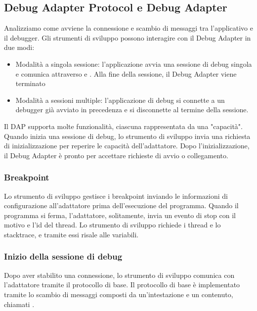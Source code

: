 \subsection{Debug Adapter Protocol e Debug Adapter}

Analizziamo come avviene la connessione e scambio di messaggi tra l'applicativo e il debugger. Gli strumenti di sviluppo possono interagire con il Debug Adapter in due modi:
\begin{itemize}
    \item {
        Modalità a singola sessione: l'applicazione avvia una sessione di debug singola e comunica attraverso  e . Alla fine della sessione, il Debug Adapter viene terminato
    }
    \item {
        Modalità a sessioni multiple: l'applicazione di debug si connette a un debugger già avviato in precedenza e si disconnette al termine della sessione.
    }
\end{itemize}


Il DAP supporta molte funzionalità, ciascuna rappresentata da una "capacità". Quando inizia una sessione di debug, lo strumento di sviluppo invia una richiesta di inizializzazione per reperire le capacità dell'adattatore. Dopo l'inizializzazione, il Debug Adapter è pronto per accettare richieste di avvio o collegamento.
\subsubsection*{Breakpoint}
Lo strumento di sviluppo gestisce i breakpoint inviando le informazioni di configurazione all'adattatore prima dell'esecuzione del programma. Quando il programma si ferma, l'adattatore, solitamente, invia un evento di stop con il motivo e l'id del thread. Lo strumento di sviluppo richiede i thread e lo stacktrace, e tramite essi risale alle variabili.

\subsubsection*{Inizio della sessione di debug}
Dopo aver stabilito una connessione, lo strumento di sviluppo comunica con l'adattatore tramite il protocollo di base. Il protocollo di base è implementato tramite lo scambio di messaggi composti da un'intestazione e un contenuto, chiamati . 

